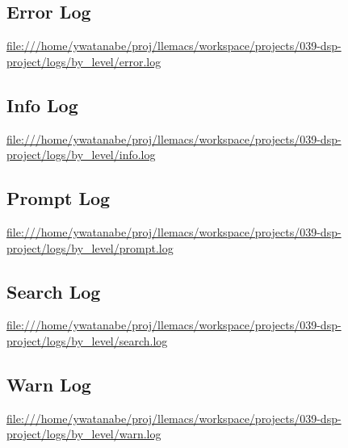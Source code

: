 \documentclass[11pt]{article}
\begin{document}
\subsection{Error Log}
\label{sec:org7150d5e}
\url{file:///home/ywatanabe/proj/llemacs/workspace/projects/039-dsp-project/logs/by\_level/error.log}

\subsection{Info Log}
\label{sec:orgd30fca9}
\url{file:///home/ywatanabe/proj/llemacs/workspace/projects/039-dsp-project/logs/by\_level/info.log}

\subsection{Prompt Log}
\label{sec:orgfaee55b}
\url{file:///home/ywatanabe/proj/llemacs/workspace/projects/039-dsp-project/logs/by\_level/prompt.log}

\subsection{Search Log}
\label{sec:orgf202d87}
\url{file:///home/ywatanabe/proj/llemacs/workspace/projects/039-dsp-project/logs/by\_level/search.log}

\subsection{Warn Log}
\label{sec:org4a8307e}
\url{file:///home/ywatanabe/proj/llemacs/workspace/projects/039-dsp-project/logs/by\_level/warn.log}
\end{document}
